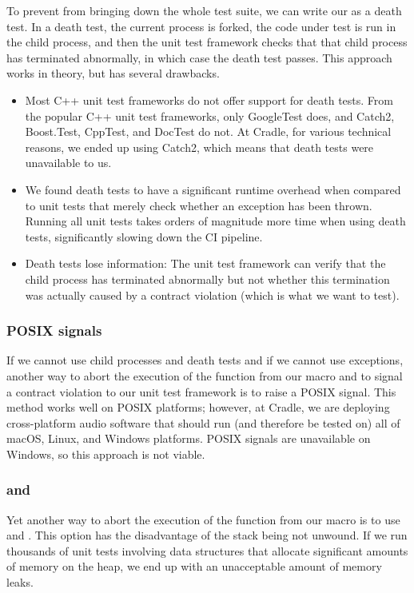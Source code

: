 To prevent  from bringing down the whole test suite, we can write our  as a death test. In a death test, the current process is forked, the code under test is run in the child process, and then the unit test framework checks that that child process has terminated abnormally, in which case the death test passes. This approach works in theory, but has several drawbacks.
\begin{itemize}
\item Most C++ unit test frameworks do not offer support for death tests. From the popular C++ unit test frameworks, only GoogleTest does, and Catch2, Boost.Test, CppTest, and DocTest do not. At Cradle, for various technical reasons, we ended up using Catch2, which means that death tests were unavailable to us.
\item We found death tests to have a significant runtime overhead when compared to unit tests that merely check whether an exception has been thrown. Running all unit tests takes orders of magnitude more time when using death tests, significantly slowing down the CI pipeline.
\item Death tests lose information: The unit test framework can verify that the child process has terminated abnormally but not whether this termination was actually caused by a contract violation (which is what we want to test).
\end{itemize}

\subsubsection{POSIX signals}

If we cannot use child processes and death tests and if we cannot use exceptions, another way to abort the execution of the function from our  macro and to signal a contract violation to our unit test framework is to raise a POSIX signal. This method works well on POSIX platforms; however, at Cradle, we are deploying cross-platform audio software that should run (and therefore be tested on) all of macOS, Linux, and Windows platforms. POSIX signals are unavailable on Windows, so this approach is not viable.

\subsubsection{ and }

Yet another way to abort the execution of the function from our  macro is to use  and . This option has the disadvantage of the stack being not unwound. If we run thousands of unit tests involving data structures that allocate significant amounts of memory on the heap, we end up with an unacceptable amount of memory leaks.

